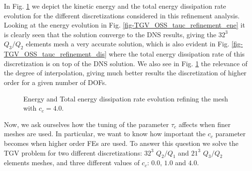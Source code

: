 In Fig. \ref{fig-TGV_OSS_tauc_refinement} we depict the kinetic energy and the total energy dissipation rate evolution for the different discretizations considered in this refinement analysis. Looking at the energy evolution in Fig. \ref{fig-TGV_OSS_tauc_refinement_ene} it is clearly seen that the solution converge to the DNS results, giving the $32^3$ $Q_3/Q_2$ elements mesh a very accurate solution, which is also evident in Fig. \ref{fig-TGV_OSS_tauc_refinement_dis} where the total energy dissipation rate of this discretization is on top of the DNS solution. We also see in Fig. \ref{fig-TGV_OSS_tauc_refinement} the relevance of the degree of interpolation, giving much better results the discretization of higher order for a given number of DOFs.
\begin{figure}[h]
  \centering
  \caption{Energy and Total energy dissipation rate evolution refining the mesh with $c_c=4.0$.}
  \label{fig-TGV_OSS_tauc_refinement}
\end{figure}

Now, we ask ourselves how the tuning of the parameter $\tau_c$ affects when finer meshes are used. In particular, we want to know how important the $c_c$ parameter becomes when higher order FEs are used. To answer this question we solve the TGV problem for two different discretizations: $32^3$ $Q_2/Q_1$ and $21^3$ $Q_3/Q_2$ elements meshes, and three different values of $c_c$: $0.0$, $1.0$ and $4.0$.

